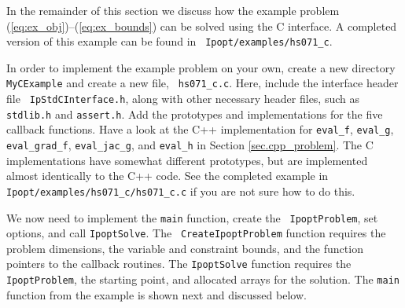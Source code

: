\documentclass[10pt]{article}
\newcommand{\Ipopt}{\textsc{Ipopt}\xspace}
\begin{document}
In the remainder of this section we discuss how the example problem
(\ref{eq:ex_obj})--(\ref{eq:ex_bounds}) can be solved using the C
interface.  A completed version of this example can be found in {\tt
  Ipopt/examples/hs071\_c}.


\vspace{\baselineskip}

In order to implement the example problem on your own, create a new
directory {\tt MyCExample} and create a new file, {\tt
  hs071\_c.c}.  Here, include the interface header file {\tt
  IpStdCInterface.h}, along with other necessary header files, such as
{\tt stdlib.h} and {\tt assert.h}.  Add the prototypes and
implementations for the five callback functions.  Have a look at the
C++ implementation for {\tt eval\_f}, {\tt eval\_g}, {\tt
  eval\_grad\_f}, {\tt eval\_jac\_g}, and {\tt eval\_h} in Section
\ref{sec.cpp_problem}. The C implementations have somewhat different
prototypes, but are implemented almost identically to the C++ code.
See the completed example in {\tt Ipopt/examples/hs071\_c/hs071\_c.c} if you
are not sure how to do this.

We now need to implement the {\tt main} function, create the {\tt
  IpoptProblem}, set options, and call {\tt IpoptSolve}. The {\tt
  CreateIpoptProblem} function requires the problem dimensions, the
variable and constraint bounds, and the function pointers to the
callback routines. The {\tt IpoptSolve} function requires the {\tt
  IpoptProblem}, the starting point, and allocated arrays for the
solution.  The {\tt main} function from the example is shown next and
discussed below.
\end{document}
